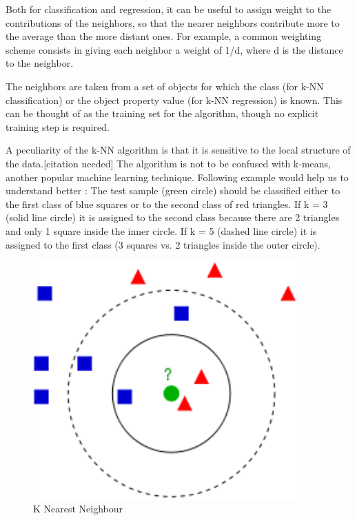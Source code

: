 {Both for classification and regression, it can be useful to assign weight to the contributions of the neighbors, so that the nearer neighbors contribute more to the average than the more distant ones. For example, a common weighting scheme consists in giving each neighbor a weight of 1/d, where d is the distance to the neighbor.

The neighbors are taken from a set of objects for which the class (for k-NN classification) or the object property value (for k-NN regression) is known. This can be thought of as the training set for the algorithm, though no explicit training step is required.

A peculiarity of the k-NN algorithm is that it is sensitive to the local structure of the data.[citation needed] The algorithm is not to be confused with k-means, another popular machine learning technique. 
 Following example would help us to understand better :
 The test sample (green circle) should be classified either to the first class of blue squares or to the second class of red triangles. If k = 3 (solid line circle) it is assigned to the second class because there are 2 triangles and only 1 square inside the inner circle. If k = 5 (dashed line circle) it is assigned to the first class (3 squares vs. 2 triangles inside the outer circle). 
\begin{figure}
    \includegraphics[width=0.9\textwidth]{Knn.png}
    \caption{K Nearest Neighbour}
    \label{fig:my_label}
\end{figure}
}